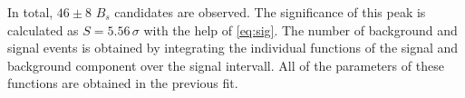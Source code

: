 In total, $46\pm8$ $B_s$ candidates are observed. The significance of this peak is calculated as $S = 5.56 \, \sigma$ with the help of \eqref{eq:sig}.
The number of background and signal events is obtained by integrating the individual functions of the signal and background component over the signal intervall.
All of the parameters of these functions are obtained in the previous fit.